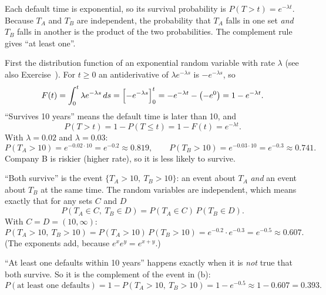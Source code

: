 \begin{solution}
	\idea Each default time is exponential, so its survival probability is
	$P(T>t)=e^{-\lambda t}$. Because $T_A$ and $T_B$ are independent, the
	probability that $T_A$ falls in one set \emph{and} $T_B$ falls in
	another is the product of the two probabilities. The complement rule
	gives ``at least one''.

	 First the distribution function of an exponential random
	variable with rate $\lambda$ (see also Exercise~). For
	$t\ge0$ an antiderivative of $\lambda e^{-\lambda s}$ is $-e^{-\lambda s}$, so
	\[ F(t)=\int_{0}^{t}\lambda e^{-\lambda s}\,ds
		=\Bigl[-e^{-\lambda s}\Bigr]_{0}^{t}
		=-e^{-\lambda t}-\bigl(-e^{0}\bigr)=1-e^{-\lambda t}. \]
	``Survives 10 years'' means the default time is later than 10, and
	\[ P(T>t)=1-P(T\le t)=1-F(t)=e^{-\lambda t}. \]
	With $\lambda=0.02$ and $\lambda=0.03$:
	\[ P(T_A>10)=e^{-0.02\cdot10}=e^{-0.2}\approx0.819,\qquad
		P(T_B>10)=e^{-0.03\cdot10}=e^{-0.3}\approx0.741. \]
	Company B is riskier (higher rate), so it is less likely to survive.

	 ``Both survive'' is the event $\{T_A>10,\ T_B>10\}$: an
	event about $T_A$ \emph{and} an event about $T_B$ at the same time. The
	random variables are independent, which means exactly that for any sets
	$C$ and $D$
	\[ P(T_A\in C,\ T_B\in D)=P(T_A\in C)\,P(T_B\in D). \]
	With $C=D=(10,\infty)$:
	\[ P(T_A>10,\ T_B>10)=P(T_A>10)\,P(T_B>10)=e^{-0.2}\cdot e^{-0.3}
		=e^{-0.5}\approx0.607. \]
	(The exponents add, because $e^{x}e^{y}=e^{x+y}$.)

	 ``At least one defaults within 10 years'' happens exactly when
	it is \emph{not} true that both survive. So it is the complement of the
	event in (b):
	\[ P(\text{at least one defaults})=1-P(T_A>10,\ T_B>10)
		=1-e^{-0.5}\approx1-0.607=0.393. \]


\end{solution}
